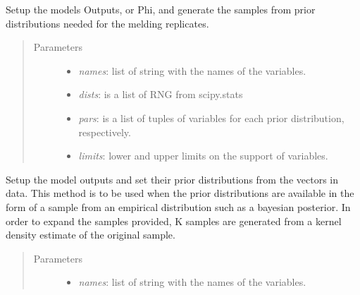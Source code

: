\documentclass[a4paper,10pt,english]{sphinxmanual}
\begin{document}
\begin{fulllineitems}
\begin{fulllineitems}
\begin{quote}
\begin{description}
\begin{itemize}
\end{itemize}

\end{description}\end{quote}

\end{fulllineitems}


\begin{fulllineitems}
\label{BIP.Bayes:BIP.Bayes.Melding.Meld.setPhi}
Setup the models Outputs, or Phi, and generate the samples from prior distributions 
needed for the melding replicates.
\begin{quote}\begin{description}
\item[{Parameters}] \leavevmode\begin{itemize}
\item {} 
\emph{names}: list of string with the names of the variables.

\item {} 
\emph{dists}: is a list of RNG from scipy.stats

\item {} 
\emph{pars}: is a list of tuples of variables for each prior distribution, respectively.

\item {} 
\emph{limits}: lower and upper limits on the support of variables.

\end{itemize}

\end{description}\end{quote}

\end{fulllineitems}


\begin{fulllineitems}
\label{BIP.Bayes:BIP.Bayes.Melding.Meld.setPhiFromData}
Setup the model outputs and set their prior distributions from the
vectors in data.
This method is to be used when the prior distributions are available in
the form of a sample from an empirical distribution such as a bayesian
posterior.
In order to expand the samples provided, K samples are generated from a
kernel density estimate of the original sample.
\begin{quote}\begin{description}
\item[{Parameters}] \leavevmode\begin{itemize}
\item {} 
\emph{names}: list of string with the names of the variables.


\end{itemize}
\end{description}
\end{quote}
\end{fulllineitems}
\end{fulllineitems}
\end{document}
